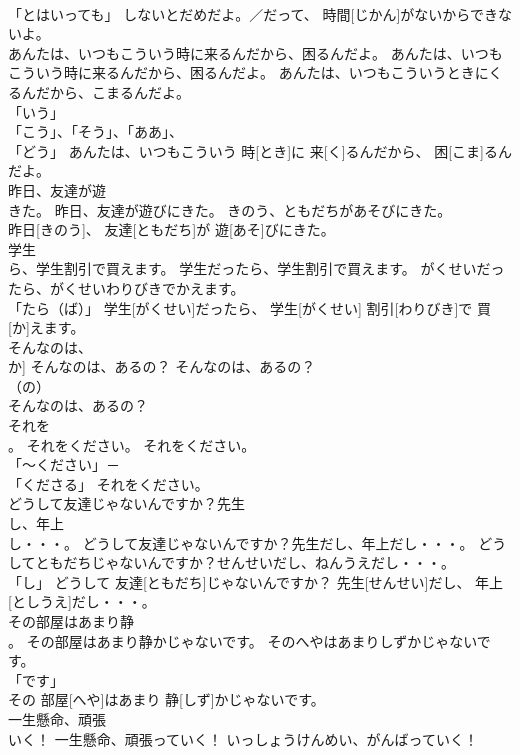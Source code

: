 \documentclass[8pt]{extreport}
\begin{document}
\begin{CJK}{UTF8}{min}
\\	「とはいっても」	しないとだめだよ。／だって、 時間[じかん]がないからできないよ。		
\\	あんたは、いつもこういう時に来るんだから、困るんだよ。	あんたは、いつもこういう時に来るんだから、困るんだよ。	あんたは、いつもこういうときにくるんだから、こまるんだよ。	
\\	「いう」 
\\	「こう」、「そう」、「ああ」、
\\	「どう」	あんたは、いつもこういう 時[とき]に 来[く]るんだから、 困[こま]るんだよ。		
\\	昨日、友達が遊
\\	きた。	昨日、友達が遊びにきた。	きのう、ともだちがあそびにきた。	
\\	昨日[きのう]、 友達[ともだち]が 遊[あそ]びにきた。		
\\	学生
\\	ら、学生割引で買えます。	学生だったら、学生割引で買えます。	がくせいだったら、がくせいわりびきでかえます。	
\\	「たら（ば）」	学生[がくせい]だったら、 学生[がくせい] 割引[わりびき]で 買[か]えます。		
\\	そんなのは、
\\	か]	そんなのは、あるの？	そんなのは、あるの？	
\\	（の）
\\	そんなのは、あるの？		
\\	それを
\\	。	それをください。	それをください。	
\\	「～ください」－ 
\\	「くださる」	それをください。		
\\	どうして友達じゃないんですか？先生
\\	し、年上
\\	し・・・。	どうして友達じゃないんですか？先生だし、年上だし・・・。	どうしてともだちじゃないんですか？せんせいだし、ねんうえだし・・・。	
\\	「し」	どうして 友達[ともだち]じゃないんですか？ 先生[せんせい]だし、 年上[としうえ]だし・・・。		
\\	その部屋はあまり静
\\	。	その部屋はあまり静かじゃないです。	そのへやはあまりしずかじゃないです。	
\\	「です」 
\\	その 部屋[へや]はあまり 静[しず]かじゃないです。		
\\	一生懸命、頑張
\\	いく！	一生懸命、頑張っていく！	いっしょうけんめい、がんばっていく！	

\end{CJK}
\end{document}
